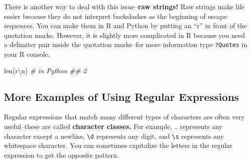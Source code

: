 \documentclass[
  12pt,
  krantz2]{krantz}
\makeatletter
\newenvironment{Shaded}{\begin{snugshade}}{\end{snugshade}}
\newcommand{\BuiltInTok}[1]{#1}
\newcommand{\CommentTok}[1]{\textcolor[rgb]{0.37,0.37,0.37}{\textit{#1}}}
\newcommand{\DocumentationTok}[1]{\textcolor[rgb]{0.37,0.37,0.37}{\textbf{\textit{#1}}}}
\newcommand{\FunctionTok}[1]{\textcolor[rgb]{0,0,0}{#1}}
\newcommand{\NormalTok}[1]{#1}
\newcommand{\StringTok}[1]{\textcolor[rgb]{0.5,0.5,0.5}{#1}}
\newcommand{\VerbatimStringTok}[1]{\textcolor[rgb]{0.5,0.5,0.5}{#1}}
\newenvironment{kframe}{%
\medskip{}
\setlength{\fboxsep}{.8em}
 \def\at@end@of@kframe{}%
 \ifinner\ifhmode%
  \def\at@end@of@kframe{\end{minipage}}%
  \begin{minipage}{\columnwidth}%
 \fi\fi%
 \def\FrameCommand##1{\hskip\@totalleftmargin \hskip-\fboxsep
 \colorbox{shadecolor}{##1}\hskip-\fboxsep
     \hskip-\linewidth \hskip-\@totalleftmargin \hskip\columnwidth}%
 \MakeFramed {\advance\hsize-\width
   \@totalleftmargin\z@ \linewidth\hsize
   \@setminipage}}%
 {\par\unskip\endMakeFramed%
 \at@end@of@kframe}
\renewenvironment{Shaded}{\begin{kframe}}{\end{kframe}}
\makeatother
\begin{document}
\begin{Shaded}
\end{Shaded}

There is another way to deal with this issue--\textbf{raw strings!} Raw strings make life easier because they do not interpret backslashes as the beginning of escape sequences. You can make them in R and Python by putting an ``r'' in front of the quotation marks. However, it is slightly more complicated in R because you need a delimiter pair inside the quotation marks--for more information type \texttt{?Quotes} in your R console.

\begin{Shaded}
\begin{Highlighting}[]
\BuiltInTok{len}\NormalTok{(}\VerbatimStringTok{r\textquotesingle{}\textbackslash{}n\textquotesingle{}}\NormalTok{) }\CommentTok{\# in Python }
\CommentTok{\#\# 2}
\end{Highlighting}
\end{Shaded}

\begin{Shaded}
\end{Shaded}

\hypertarget{more-examples-of-using-regular-expressions}{%
\subsection{More Examples of Using Regular Expressions}\label{more-examples-of-using-regular-expressions}}

Regular expressions that match many different types of characters are often very useful--these are called \textbf{character classes.} For example, \texttt{.} represents any character except a newline, \texttt{\textbackslash{}d} represents any digit, and \texttt{\textbackslash{}s} represents any whitespace character. You can sometimes capitalize the letters in the regular expression to get the opposite pattern.
\end{document}
